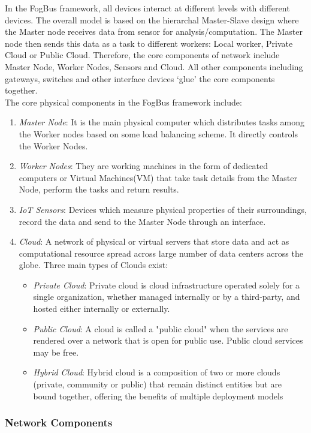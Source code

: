 \documentclass[10pt,journal,compsoc]{IEEEtran}
\begin{document}
In the FogBus framework, all devices interact at different levels with different devices. The overall model is based on the hierarchal Master-Slave design where the Master node receives data from sensor for analysis/computation. The Master node then sends this data as a task to different workers: Local worker, Private Cloud or Public Cloud. Therefore, the core components of network include Master Node, Worker Nodes, Sensors and Cloud. All other components including gateways, switches and other interface devices ‘glue’ the core components together.\\
The core physical components in the FogBus framework include:
\begin{enumerate}
\item \textit{Master Node}: It is the main physical computer which distributes tasks among the Worker nodes based on some load balancing scheme. It directly controls the Worker Nodes.
\item \textit{Worker Nodes}: They are working machines in the form of dedicated computers or Virtual Machines(VM) that take task details from the Master Node, perform the tasks and return results. 
\item \textit{IoT Sensors}: Devices which measure physical properties of their surroundings, record the data and send to the Master Node through an interface. 
\item \textit{Cloud}: A network of physical or virtual servers that store data and act as computational resource spread across large number of data centers across the globe. Three main types of Clouds exist:
\begin{itemize}
\item \textit{Private Cloud}: Private cloud is cloud infrastructure operated solely for a single organization, whether managed internally or by a third-party, and hosted either internally or externally.
\item \textit{Public Cloud}: A cloud is called a "public cloud" when the services are rendered over a network that is open for public use. Public cloud services may be free.
\item \textit{Hybrid Cloud}: Hybrid cloud is a composition of two or more clouds (private, community or public) that remain distinct entities but are bound together, offering the benefits of multiple deployment models
\end{itemize}
\end{enumerate}

\subsubsection{Network Components}
\end{document}
